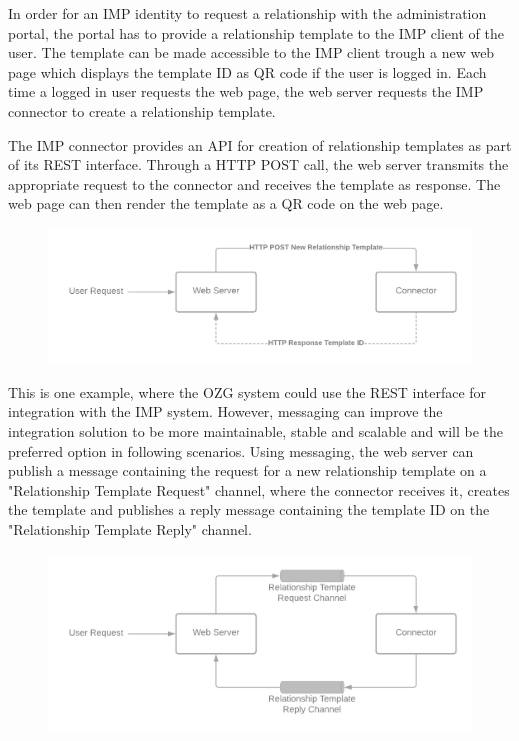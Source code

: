 \documentclass[
     12pt,         %
     a4paper,      %
     BCOR=10mm,version=first,     %
     DIV=14,version=first,        %
     ]{scrreprt}
\begin{document}
In order for an IMP identity to request a relationship with the administration portal, the portal has to provide a relationship template to the IMP client of the user. The template can be made accessible to the IMP client trough a new web page which displays the template ID as QR code if the user is logged in. Each time a logged in user requests the web page, the web server requests the IMP connector to create a relationship template.

The IMP connector provides an API for creation of relationship templates as part of its REST interface. Through a HTTP POST call, the web server transmits the appropriate request to the connector and receives the template as response. The web page can then render the template as a QR code on the web page.

\begin{figure}[h]
    \centering
    \includegraphics[scale=0.3]{Diagrams/Integration Architecture 1/Overview/Relationship Template REST.png}
\end{figure}

This is one example, where the OZG system could use the REST interface for integration with the IMP system. However, messaging can improve the integration solution to be more maintainable, stable and scalable and will be the preferred option in following scenarios. Using messaging, the web server can publish a message containing the request for a new relationship template on a "Relationship Template Request" channel, where the connector receives it, creates the template and publishes a reply message containing the template ID on the "Relationship Template Reply" channel.

\begin{figure}[h]
    \centering
    \includegraphics[scale=0.3]{Diagrams/Integration Architecture 1/Overview/Relationship Template Messaging.png}
\end{figure}
\end{document}
